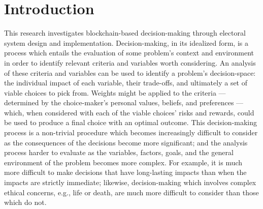 \chapter{Introduction}\label{chap:intro}


%
%
%

This research investigates blockchain-based decision-making through electoral
system design and implementation. Decision-making, in its idealized form, is a
process which entails the evaluation of some problem's context and environment
in order to identify relevant criteria and variables worth considering. An
analysis of these criteria and variables can be used to identify a problem's
decision-space: the individual impact of each variable, their trade-offs, and
ultimately a set of viable choices to pick from. Weights might be applied to
the criteria --- determined by the choice-maker's personal values, beliefs, and
preferences ---  which, when considered with each of the viable choices' risks
and rewards, could be used to produce a final choice with an optimal outcome.
This decision-making process is a non-trivial procedure which becomes
increasingly difficult to consider as the consequences of the decisions become
more significant; and the analysis process harder to evaluate as the variables,
factors, goals, and the general environment of the problem becomes more complex.
For example, it is much more difficult to make decisions that have long-lasting
impacts than when the impacts are strictly immediate; likewise, decision-making
which involves complex ethical concerns, e.g., life or death, are much more
difficult to consider than those which do not.

